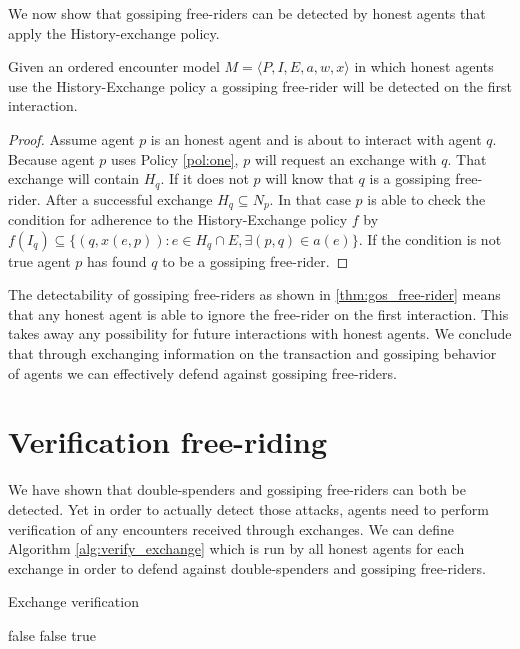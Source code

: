 We now show that gossiping free-riders can be detected by honest agents that apply the History-exchange
policy.

\begin{thm}
    \label{thm:gos_free-rider}
    Given an ordered encounter model $M = \langle P, I, E, a, w, x \rangle$ in which honest agents use the History-Exchange policy
    a gossiping free-rider will be detected on the first interaction.
\end{thm}
\begin{proof}
    Assume agent $p$ is an honest agent and is about to interact with agent $q$. Because agent $p$
    uses Policy \ref{pol:one}, $p$ will request an exchange with $q$. That exchange will contain 
    $H_q$. If it does not $p$ will know that $q$ is a gossiping free-rider. After a successful
    exchange $H_q \subseteq N_p$. In that case $p$ is able to check the condition for adherence to 
    the History-Exchange policy $f$ by $f(I_q) \subseteq \{ (q, x(e, p)) : e \in 
    H_q \cap E, \exists (p, q) \in a(e)\}$. If the condition is not true agent $p$ has found $q$ to be a
    gossiping free-rider.
\end{proof}

The detectability of gossiping free-riders as shown in \ref{thm:gos_free-rider} means that any 
honest agent is able to ignore the free-rider on the first interaction. This takes away any 
possibility for future interactions with honest agents. We conclude that through exchanging
information on the transaction and gossiping behavior of agents we can effectively defend against 
gossiping free-riders.

\section{Verification free-riding}
\label{sec:verification_free-riding}
We have shown that double-spenders and gossiping free-riders can both be detected. Yet in order to 
actually detect those attacks, agents need to perform verification of any encounters received 
through exchanges. We can define Algorithm \ref{alg:verify_exchange} which is run by all 
honest agents for each exchange in order to defend against double-spenders and gossiping free-riders.

\begin{algorithm}
\caption{Exchange verification}\label{alg:verify_exchange}
\begin{algorithmic}[1]
 \Return false
\EndIf
\EndFor
{}
 \Return false
\EndIf
\EndFor
\Return true
\EndProcedure
\end{algorithmic}
\end{algorithm}


